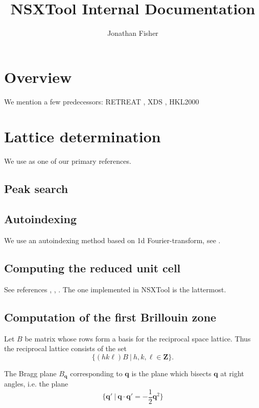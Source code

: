 \documentclass{report}
\title{NSXTool Internal Documentation}
\author{Jonathan Fisher}
\newcommand{\bq}{\mathbf{q}}
\begin{document}
\maketitle

\tableofcontents

\chapter{Overview}

We mention a few predecessors: RETREAT \cite{retreat-manual}, XDS \cite{xds-2010}, HKL2000 \cite{otwinowski-1997, denzo-scalepack, hkl2000-manual}

\chapter{Lattice determination}

We use \cite{crystal-lattices} as one of our primary references.

\section{Peak search}

\section{Autoindexing}

We use an autoindexing method based on 1d Fourier-transform, see \cite{fft1, fft2}.

\section{Computing the reduced unit cell}

See references \cite{gruber-1973}, \cite{krivy-gruber-1976}, \cite{unit-cell-2003}. The one implemented in NSXTool is the lattermost.

\section{Computation of the first Brillouin zone}

Let $B$ be matrix whose rows form a basis for the reciprocal space lattice. Thus the reciprocal lattice consists
of the set
\[ \{ (h k \ell) B \ | \ h,k,\ell \in \mathbf{Z} \}. \]

The Bragg plane $B_\bq$ corresponding to $\bq$ is the plane which bisects $\bq$ at right angles, i.e. the plane
\[ \{ \bq' \ | \ \bq \cdot \bq' = -\frac{1}{2} \bq^2\} \]
\end{document}
